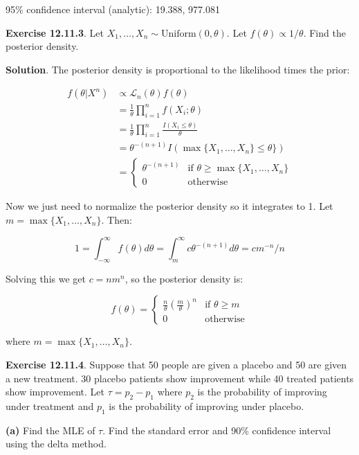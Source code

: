 \begin{console}
95\% confidence interval (analytic):  19.388, 977.081
\end{console}

\textbf{Exercise 12.11.3}. Let
\(X_1, \dots, X_n \sim \text{Uniform}(0, \theta)\). Let
\(f(\theta) \propto 1/\theta\). Find the posterior density.

\textbf{Solution}. The posterior density is proportional to the
likelihood times the prior:

\begin{align}
f(\theta | X^n) &\propto \mathcal{L}_n(\theta) f(\theta) \\
&= \frac{1}{\theta} \prod_{i=1}^n f(X_i; \theta)  \\
&= \frac{1}{\theta} \prod_{i=1}^n \frac{I(X_i \leq \theta)}{\theta} \\
&= \theta^{-(n+1)} I( \max \{ X_1, \dots, X_n \} \leq \theta \} ) \\
&= \begin{cases}
\theta^{-(n+1)} & \text{if } \theta \geq \max \{ X_1, \dots, X_n \} \\
0 & \text{otherwise}
\end{cases}
\end{align}

Now we just need to normalize the posterior density so it integrates to
1. Let \(m = \max \{ X_1, \dots, X_n \}\). Then:

\[ 1 = \int_{-\infty}^\infty f(\theta) d\theta  = \int_m^\infty c \theta^{-(n+1)} d\theta = c m^{-n} / n\]

Solving this we get \(c = n m^n\), so the posterior density is:

\[
f(\theta) = \begin{cases}
\frac{n}{\theta} \left(\frac{m}{\theta}\right)^n & \text{if } \theta \geq m \\
0 & \text{otherwise}
\end{cases}
\]

where \(m = \max \{ X_1, \dots, X_n \}\).

\textbf{Exercise 12.11.4}. Suppose that 50 people are given a placebo
and 50 are given a new treatment. 30 placebo patients show improvement
while 40 treated patients show improvement. Let \(\tau = p_2 - p_1\)
where \(p_2\) is the probability of improving under treatment and
\(p_1\) is the probability of improving under placebo.

\textbf{(a)} Find the MLE of \(\tau\). Find the standard error and 90\%
confidence interval using the delta method.

